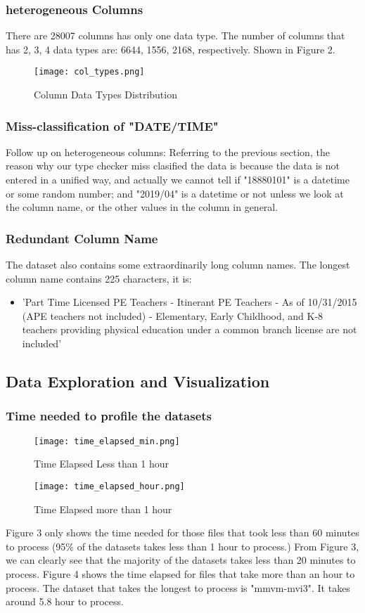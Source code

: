 \documentclass[sigconf]{acmart}
\begin{document}
\subsubsection{heterogeneous Columns} There are 28007 columns has only one data type. The number of columns that has 2, 3, 4 data types are: 6644, 1556, 2168, respectively. Shown in Figure 2.
\begin{figure}[htp]
    \centering
    \texttt{[image: col\_types.png]}
    \caption{Column Data Types Distribution}
    \label{fig:galaxy}
\end{figure}
\subsubsection{Miss-classification of "DATE/TIME"} Follow up on heterogeneous columns: Referring to the previous section, the reason why our type checker miss clasified the data is because the data is not entered in a unified way, and actually we cannot tell if "18880101" is a datetime or some random number; and "2019/04" is a datetime or not unless we look at the column name, or the other values in the column in general.
\subsubsection{Redundant Column Name} The dataset also contains some extraordinarily long column names. The longest column name contains 225 characters, it is:
\begin{itemize}
    \item 'Part Time Licensed PE Teachers - Itinerant PE Teachers - As of 10/31/2015 (APE teachers not included) - Elementary, Early Childhood, and K-8 teachers providing physical education under a common branch license are not included'
\end{itemize}

\subsection{Data Exploration and Visualization}
\subsubsection{Time needed to profile the datasets}
\begin{figure}[htp]
    \centering
    \texttt{[image: time\_elapsed\_min.png]}
    \caption{Time Elapsed Less than 1 hour}
    \label{fig:galaxy}
\end{figure}
\begin{figure}[htp]
    \centering
    \texttt{[image: time\_elapsed\_hour.png]}
    \caption{Time Elapsed more than 1 hour}
    \label{fig:galaxy}
\end{figure}
Figure 3 only shows the time needed for those files that took less than 60 minutes to process (95\% of the datasets takes less than 1 hour to process.) From Figure 3, we can clearly see that the majority of the datasets takes less than 20 minutes to process. Figure 4 shows the time elapsed for files that take more than an hour to process. The dataset that takes the longest to process is "mmvm-mvi3". It takes around 5.8 hour to process.
\end{document}
